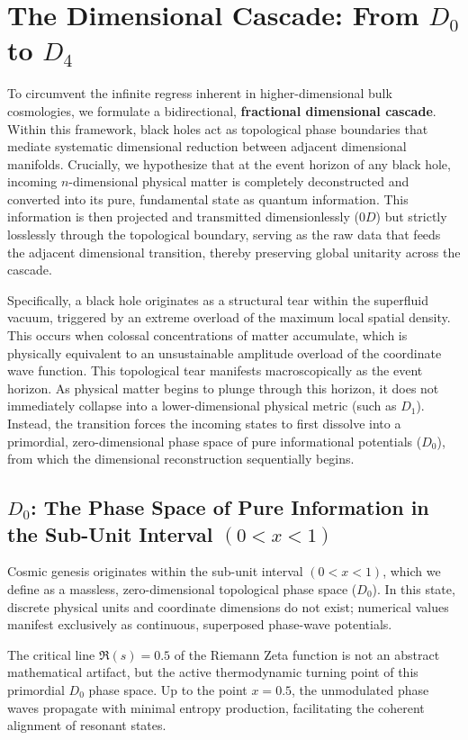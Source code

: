 \documentclass[11pt,a4paper]{article}
\theoremstyle{plain}
\theoremstyle{definition}
\theoremstyle{remark}
\begin{document}
\section{The Dimensional Cascade: From $D_0$ to $D_4$}
To circumvent the infinite regress inherent in higher-dimensional bulk cosmologies, we formulate a bidirectional, \textbf{fractional dimensional cascade}. Within this framework, black holes act as topological phase boundaries that mediate systematic dimensional reduction between adjacent dimensional manifolds. Crucially, we hypothesize that at the event horizon of any black hole, incoming $n$-dimensional physical matter is completely deconstructed and converted into its pure, fundamental state as quantum information. This information is then projected and transmitted dimensionlessly ($0D$) but strictly losslessly through the topological boundary, serving as the raw data that feeds the adjacent dimensional transition, thereby preserving global unitarity across the cascade.

Specifically, a black hole originates as a structural tear within the superfluid vacuum, triggered by an extreme overload of the maximum local spatial density. This occurs when colossal concentrations of matter accumulate, which is physically equivalent to an unsustainable amplitude overload of the coordinate wave function. This topological tear manifests macroscopically as the event horizon. As physical matter begins to plunge through this horizon, it does not immediately collapse into a lower-dimensional physical metric (such as $D_1$). Instead, the transition forces the incoming states to first dissolve into a primordial, zero-dimensional phase space of pure informational potentials ($D_0$), from which the dimensional reconstruction sequentially begins.

\subsection{$D_0$: The Phase Space of Pure Information in the Sub-Unit Interval $(0 < x < 1)$}
Cosmic genesis originates within the sub-unit interval $(0 < x < 1)$, which we define as a massless, zero-dimensional topological phase space ($D_0$). In this state, discrete physical units and coordinate dimensions do not exist; numerical values manifest exclusively as continuous, superposed phase-wave potentials.

The critical line $\mathfrak{R}(s) = 0.5$ of the Riemann Zeta function is not an abstract mathematical artifact, but the active thermodynamic turning point of this primordial $D_0$ phase space. Up to the point $x = 0.5$, the unmodulated phase waves propagate with minimal entropy production, facilitating the coherent alignment of resonant states.
\end{document}
